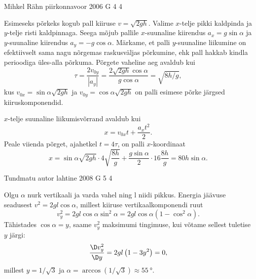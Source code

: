 \documentclass[11pt]{article}
\begin{document}
{%
{Mihkel Rähn} %
{piirkonnavoor} %
{2006} %
{G 4} %
{4} %
{

\ifSolution
Esimeseks põrkeks kogub pall kiiruse $v = \sqrt{2gh}$. Valime $x$-telje pikki kaldpinda ja $y$-telje risti kaldpinnaga. Seega mõjub pallile $x$-suunaline kiirendus $a_x = g\sin\alpha$ ja $y$-suunaline kiirendus $a_y = -g\cos\alpha$. Märkame, et palli $y$-suunaline liikumine on efektiivselt sama nagu nõrgemas raskusväljas põrkumine, ehk pall hakkab kindla perioodiga üles-alla põrkuma. Põrgete vaheline aeg avaldub kui 
\[
\tau = \frac{2v_{0y}}{|a_y|} = \frac{2 \sqrt{2 g h} \cos \alpha}{g \cos \alpha} = \sqrt{8h/g},
\]
kus $v_{0x} = \sin\alpha\sqrt{2gh}$ ja $v_{0y}=\cos\alpha\sqrt{2gh}$ on palli esimese põrke järgsed kiiruskomponendid.

$x$-telje suunaline liikumisvõrrand avaldub kui
\[
x = v_{0x}t + \frac{a_xt^2}{2}.
\]
Peale viienda põrget, ajahetkel $t = 4\tau$, on palli $x$-koordinaat
\[
x = \sin\alpha\sqrt{2gh}\cdot 4\sqrt{\frac{8h}{g}} + \frac{g\sin\alpha}{2}\cdot 16\frac{8h}{g} = 80h\sin\alpha.
\]
\fi
}

{Tundmatu autor} %
{lahtine} %
{2008} %
{G 5} %
{4} %
{

\ifSolution
Olgu $\alpha$ nurk vertikaali ja varda vahel ning l niidi pikkus. Energia jäävuse seadusest
$v^2 = 2gl \cos \alpha$, millest kiiruse vertikaalkomponendi ruut
\[
v_{y}^{2}=2 g l \cos \alpha \sin ^{2} \alpha=2 g l \cos \alpha\left(1-\cos ^{2} \alpha\right).
\]
Tähistades $\cos \alpha = y$, saame $v_y^2$ maksimumi tingimuse, kui võtame sellest tuletise $y$ järgi:
\[
\frac{\D v_{y}^{2}}{\D y}=2 g l\left( 1-3 y^{2}\right)=0,
\]
millest $y = 1/ \sqrt 3$ ja $\alpha = \arccos \left( 1/ \sqrt 3\right) \approx \SI{55}{\degree}$.

\vspace{0.5\baselineskip}

}}
\end{document}
